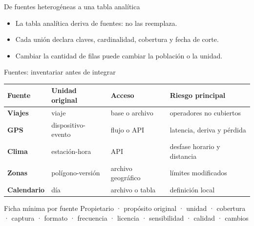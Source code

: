 \documentclass[aspectratio=169,11pt]{beamer}
\newcommand{\br}{\\}
\begin{document}
\begin{frame}{De fuentes heterogéneas a una tabla analítica}
  \centering
  \vspace{0.6em}
  \begin{itemize}
    \item La tabla analítica deriva de fuentes: no las reemplaza.
    \item Cada unión declara claves, cardinalidad, cobertura y fecha de corte.
    \item Cambiar la cantidad de filas puede cambiar la población o la unidad.
  \end{itemize}
\end{frame}

\begin{frame}{Fuentes: inventariar antes de integrar}
  \small
  \begin{tabularx}{\textwidth}{>{\bfseries}p{} p{} p{} X}
    \toprule
    Fuente & Unidad original & Acceso & Riesgo principal \\
    \midrule
    Viajes & viaje & base o archivo & operadores no cubiertos \\
    GPS & dispositivo-evento & flujo o API & latencia, deriva y pérdida \\
    Clima & estación-hora & API & desfase horario y distancia \\
    Zonas & polígono-versión & archivo geográfico & límites modificados \\
    Calendario & día & archivo o tabla & definición local \\
    \bottomrule
  \end{tabularx}
  \vfill
  \begin{block}{Ficha mínima por fuente}
    Propietario · propósito original · unidad · cobertura · captura · formato · frecuencia · licencia · sensibilidad · calidad · cambios
  \end{block}
\end{frame}
\end{document}
